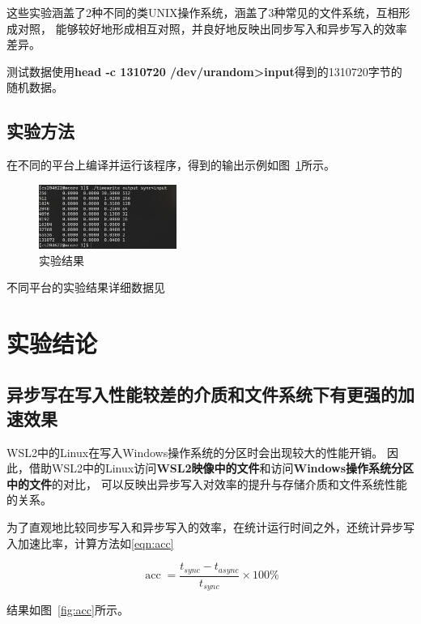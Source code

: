\documentclass[a4paper,twoside]{article}
\begin{document}
\begin{spacing}{1.2}
这些实验涵盖了2种不同的类UNIX操作系统，涵盖了3种常见的文件系统，互相形成对照，
能够较好地形成相互对照，并良好地反映出同步写入和异步写入的效率差异。

测试数据使用\textbf{head -c 1310720 /dev/urandom>input}得到的1310720字节的
随机数据。

\subsection{实验方法}

在不同的平台上编译并运行该程序，得到的输出示例如图~\ref{fig:output}所示。

\begin{figure}[htbp]
	\centering
	\caption{实验结果}
	\label{fig:output}
	\includegraphics[width=0.4\textwidth]{output.png}
\end{figure}

不同平台的实验结果详细数据见

\section{实验结论}

\subsection{异步写在写入性能较差的介质和文件系统下有更强的加速效果}

WSL2中的Linux在写入Windows操作系统的分区时会出现较大的性能开销\cite{githubwsl2Filesystem}。
因此，借助WSL2中的Linux访问\textbf{WSL2映像中的文件}和访问\textbf{Windows操作系统分区中的文件}的对比，
可以反映出异步写入对效率的提升与存储介质和文件系统性能的关系。

为了直观地比较同步写入和异步写入的效率，在统计运行时间之外，还统计异步写入加速比率，计算方法如\eqref{eqn:acc}

\begin{equation}
	\label{eqn:acc}
	\mathop{\mathrm{acc}}=\frac{t_{sync}-t_{async}}{t_{sync}} \times 100\%
\end{equation}

结果如图~\ref{fig:acc}所示。


\end{spacing}
\end{document}
